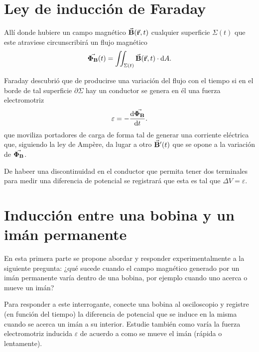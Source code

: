 \documentclass[laboratorio]{guia}
\begin{document}
 
\maketitle

\section{Ley de inducción de Faraday}
Allí donde hubiere un campo magnético \(\va{B}(\va{r},t)\) cualquier superficie \(\Sigma (t)\) que este atraviese circunscribirá un flujo magnético
\begin{equation}
  \va{\Phi_B} (t)= \iint_{\Sigma(t)} \va{B}(\va{r},t) \cdot \dd A.
\end{equation}

Faraday descubrió que de producirse una variación del flujo con el tiempo si en el borde de tal superficie \(\partial \Sigma\) hay un conductor se genera en él una fuerza electromotriz
\begin{equation}
  \varepsilon= - \dv{\va{\Phi_B}}{t}.
\end{equation}
que moviliza portadores de carga de forma tal de generar una corriente eléctrica que, siguiendo la ley de Ampère, da lugar a otro \(\va{B}'(t)\) que se opone a la variación de \(\va{\Phi_B}\).

De habeer una discontinuidad en el conductor que permita tener dos terminales para medir una diferencia de potencial se registrará que esta es tal que \(\Delta V = \varepsilon\).



\section{Inducción entre una bobina y un imán permanente}
En esta primera parte se propone abordar y responder experimentalmente a la siguiente pregunta: ¿qué sucede cuando el campo magnético generado por un imán permanente varía dentro de una bobina, por ejemplo cuando uno acerca o mueve un imán? 

Para responder a este interrogante, conecte una bobina al osciloscopio y registre (en función del tiempo) la diferencia de potencial que se induce en la misma cuando se acerca un imán a su interior.
Estudie también como varía la fuerza electromotriz inducida \(\varepsilon\) de acuerdo a como se mueve el imán (rápida o lentamente). 
\end{document}
